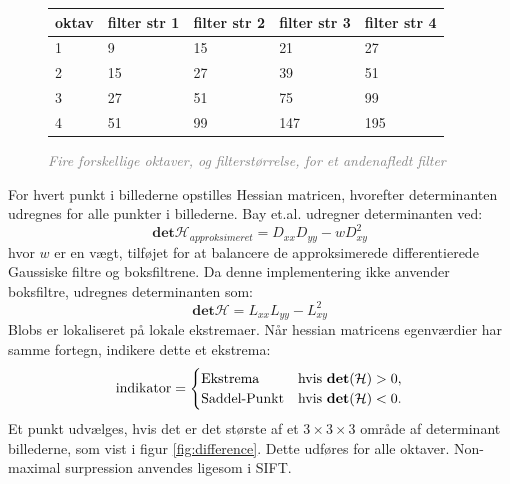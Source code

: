 \begin{figure}[H]
    \centering
    \begin{center}    
    \begin{tabular}{ | l | l | l | l | l |}
    \hline
    oktav & filter str 1 & filter str 2 & filter str 3 & filter str 4 \\ \hline
    1 & 9 & 15 & 21 & 27 \\ \hline
  	2 & 15 & 27 & 39 & 51 \\ \hline
  	3 & 27 & 51 & 75 & 99 \\ \hline
  	4 & 51 & 99 & 147 & 195 \\ \hline
    \end{tabular}       
    \caption{\textcolor{gray}{\footnotesize \textit{Fire forskellige oktaver, og filterstørrelse, for et andenafledt filter}}}
    \label{fig:secderivfiltersize}
     \end{center}
     \vspace{-2.5em}
  \end{figure} \noindent
For hvert punkt i billederne opstilles Hessian matricen, hvorefter determinanten udregnes for alle punkter i billederne. Bay et.al. udregner determinanten ved:
\begin{equation}
\textbf{det}\mathcal{H}_{approksimeret} = D_{xx}D_{yy}-wD_{xy}^2
\label{deerminantofhessian}
\end{equation}
hvor $w$ er en vægt, tilføjet for at balancere de approksimerede differentierede Gaussiske filtre og boksfiltrene. Da denne implementering ikke anvender boksfiltre, udregnes determinanten som:
\begin{equation}
\textbf{det}\mathcal{H} = L_{xx}L_{yy}-L_{xy}^2
\label{deerminantofhessian}
\end{equation}
Blobs er lokaliseret på lokale ekstremaer. Når hessian matricens egenværdier har samme fortegn, indikere dette et ekstrema:
\begin{equation}
\begin{split}
\text{indikator} = 
\begin{cases}
\text{Ekstrema}& \text{hvis } \bold{det}(\mathcal{H}) > 0,  \\
\text{Saddel-Punkt} & \text{hvis } \bold{det}(\mathcal{H}) < 0.
\end{cases}
\end{split}
\label{detman}
\end{equation}
Et punkt udvælges, hvis det er det største af et $3\times3\times3$ område af determinant billederne, som vist i figur \ref{fig:difference}. Dette udføres for alle oktaver. Non-maximal surpression anvendes ligesom i SIFT.
\\
\\
